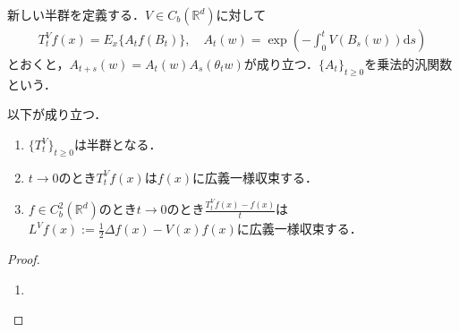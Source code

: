 \documentclass[dvipdfmx]{jsarticle}
\newtheorem{proof}{証明}
\begin{document}
%
%
新しい半群を定義する．$V\in C_b(\mathbb{R}^d)$に対して
\begin{align*}
T_t^V f(x)=E_x\{A_t f(B_t)\},\quad A_t(w)=\exp{\left(-\int_0^t V(B_s(w))\mathrm{d}s\right)}
\end{align*}
とおくと，$A_{t+s}(w)=A_t(w)A_s(\theta_t w)$が成り立つ．$\{A_t\}_{t\geq 0}$を乗法的汎関数という．
\begin{screen}
以下が成り立つ．
\begin{enumerate}
\vspace{-0.7zh}%
\renewcommand{\labelenumi}{(\arabic{enumi})}
\item $\{T^V_t\}_{t\geq 0}$は半群となる．
\item $t\to 0$のとき$T_t^V f(x)$は$f(x)$に広義一様収束する．
\item $f\in C^2_b(\mathbb{R}^d)$のとき$t\to 0$のとき$\displaystyle \frac{T_t^V f(x)-f(x)}{t}$は$\displaystyle L^Vf(x):=\frac{1}{2}\Delta f(x)-V(x)f(x)$に広義一様収束する．
\end{enumerate}
\end{screen}
\vspace{-0.7zh}%
\vspace{-0.7zh}%
\vspace{-0.7zh}%
\vspace{-0.7zh}%
\begin{proof}
\begin{enumerate}
\renewcommand{\labelenumi}{(\arabic{enumi})}
\item 
\end{enumerate}
\end{proof}
%
%
%
%
\newpage
\end{document}
